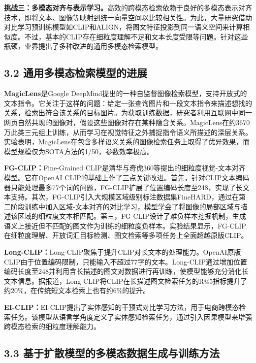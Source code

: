 \documentclass[12pt,a4paper]{article}
\begin{document}
\textbf{挑战三：多模态对齐与表示学习。}高效的跨模态检索依赖于良好的多模态表示对齐技术，即将文本、图像等映射到统一向量空间以比较相关性\cite{radford2021clip}。为此，大量研究借助对比学习预训练模型如CLIP和ALIGN，将图文特征投影到同一语义空间来计算相似度\cite{radford2021clip,gomez2021align}。不过，基本的CLIP存在细粒度理解不足和文本长度受限等问题\cite{xie2025fgclip,zhang2024longclip}。针对这些瓶颈，业界提出了多种改进的通用多模态检索模型\cite{xie2025fgclip,zhang2024longclip,ma2022eiclip}。

\subsection*{3.2 通用多模态检索模型的进展}

\textbf{MagicLens}是Google DeepMind提出的一种自监督图像检索模型，支持开放式的文本指令\cite{zhang2024magiclens}。它关注于这样的问题：给定一张查询图片和一段文本指令来描述想找的关系，检索出符合该关系的目标图片。为获取训练数据，研究者利用互联网中同一网页自然共现的图像对，假设这些图像对存在某种隐含关系。MagicLens在约3670万此类三元组上训练，从而学习在视觉特征之外捕捉指令语义所描述的深层关系。实验表明，MagicLens在包含多样语义关系的图像检索任务上取得了优异效果，而模型规模仅为SOTA方法的1/50，参数效率极高。

\textbf{FG-CLIP：}Fine-Grained CLIP是清华与奇虎360等提出的细粒度视觉-文本对齐模型\cite{xie2025fgclip}。它在OpenAI CLIP的基础上作了三点关键改进。首先，针对CLIP文本编码器只能处理最多77个词的问题，FG-CLIP扩展了位置编码长度至248，实现了长文本支持。其次，FG-CLIP引入大规模区域级别标注数据集FineHARD，通过在第二阶段训练中加入区域-文本对齐的对比学习，模型学会了将图像的局部区域与描述该区域的细粒度文本相匹配。第三，FG-CLIP设计了难负样本挖掘机制，生成语义上接近但不匹配的图文作为训练的细粒度负样本。实验结果显示，FG-CLIP在细粒度理解、开放词汇目标检测、图文检索等多项任务上全面超越原版CLIP。

\textbf{Long-CLIP：}Long-CLIP聚焦于提升CLIP对长文本的处理能力\cite{zhang2024longclip}。OpenAI原版CLIP由于位置编码限制，只能输入不超过77字的文本。Long-CLIP通过增加位置编码长度至248并利用含长描述的图文对数据进行再训练，使模型能够充分消化长文本信息。据报道，Long-CLIP将CLIP在长描述图文检索任务的R@5指标提升了约20\%，在传统短文本检索上也有约6\%的提升。

\textbf{EI-CLIP：}EI-CLIP提出了实体感知的干预式对比学习方法，用于电商跨模态检索任务\cite{ma2022eiclip}。该模型从语言学角度定义了实体感知检索任务，通过引入因果模型来增强跨模态检索的细粒度理解能力。

\subsection*{3.3 基于扩散模型的多模态数据生成与训练方法}
\end{document}
